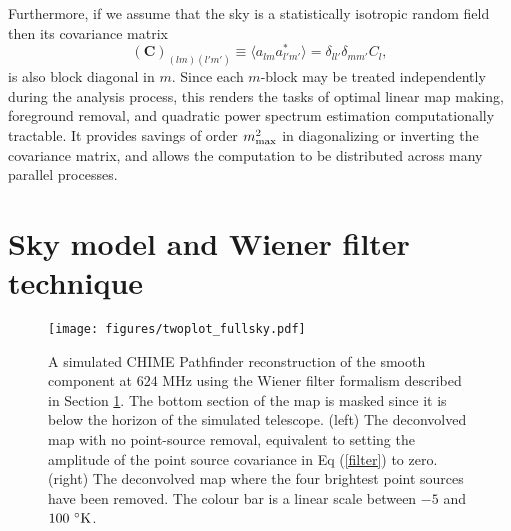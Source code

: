 Furthermore, if we assume that the sky is a statistically isotropic random field then its covariance matrix
\begin{equation}
(\mathbf{C})_{(lm)(l'm')} \equiv \langle a_{lm} a_{l'm'}^* \rangle = \delta_{ll'} \delta_{mm'} C_l,
\end{equation}
is also block diagonal in $m$. Since each $m$-block may be treated independently during the analysis process, this renders the tasks of optimal linear map making, foreground removal, and quadratic power spectrum estimation computationally tractable. It provides savings of order $m_{\rm max}^2$ in diagonalizing or inverting the covariance matrix, and allows the computation to be distributed across many parallel processes.

\section{Sky model and Wiener filter technique}
\label{sec:model}

\begin{figure*}
\centering
\texttt{[image: figures/twoplot\_fullsky.pdf]}
\caption{A simulated CHIME Pathfinder reconstruction of the smooth component at $624$ MHz using the Wiener filter formalism described in Section \ref{sec:model}. The bottom section of the map is masked since it is below the horizon of the simulated telescope. (left) The deconvolved map with no point-source removal, equivalent to setting the amplitude of the point source covariance in Eq (\ref{filter}) to zero. (right) The deconvolved map where the four brightest point sources have been removed. The colour bar is a linear scale between $-5$ and $100~{\rm ^{\circ}K}$.}
\label{standard}
\end{figure*}

